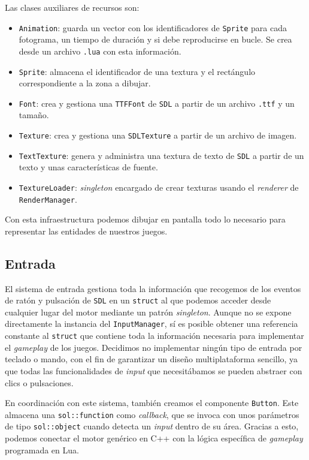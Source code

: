 Las clases auxiliares de recursos son: 

\begin{itemize}
	\item \texttt{Animation}: guarda un vector con los identificadores de \texttt{Sprite} para cada fotograma, un tiempo de duración y si debe reproducirse en bucle. Se crea desde un archivo \texttt{.lua} con esta información. 
	\item \texttt{Sprite}: almacena el identificador de una textura y el rectángulo correspondiente a la zona a dibujar. 
	\item \texttt{Font}: crea y gestiona una \texttt{TTFFont} de \texttt{SDL} a partir de un archivo \texttt{.ttf} y un tamaño. 
	\item \texttt{Texture}: crea y gestiona una \texttt{SDLTexture} a partir de un archivo de imagen. 
	\item \texttt{TextTexture}: genera y administra una textura de texto de \texttt{SDL} a partir de un texto y unas características de fuente.
	\item \texttt{TextureLoader}: \textit{singleton} encargado de crear texturas usando el \textit{renderer} de \texttt{RenderManager}.  
\end{itemize}

Con esta infraestructura podemos dibujar en pantalla todo lo necesario para representar las entidades de nuestros juegos. 

\subsection{Entrada}
El sistema de entrada gestiona toda la información que recogemos de los eventos de ratón y pulsación de \texttt{SDL} en un \texttt{struct} al que podemos acceder desde cualquier lugar del motor mediante un patrón \textit{singleton}. Aunque no se expone directamente la instancia del \texttt{InputManager}, sí es posible obtener una referencia constante al \texttt{struct} que contiene toda la información necesaria para implementar el \textit{gameplay} de los juegos. Decidimos no implementar ningún tipo de entrada por teclado o mando, con el fin de garantizar un diseño multiplataforma sencillo, ya que todas las funcionalidades de \textit{input} que necesitábamos se pueden abstraer con clics o pulsaciones. 

\medskip

En coordinación con este sistema, también creamos el componente \texttt{Button}. Este almacena una \texttt{sol::function} como \textit{callback}, que se invoca con unos parámetros de tipo \texttt{sol::object} cuando detecta un \textit{input} dentro de su área. Gracias a esto, podemos conectar el motor genérico en C++ con la lógica específica de \textit{gameplay} programada en Lua. 


